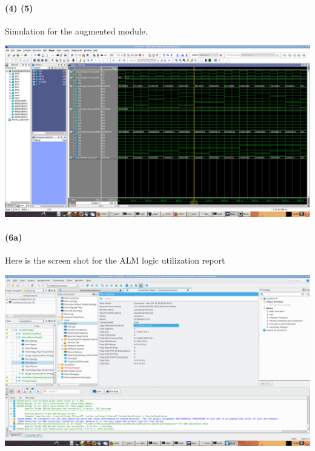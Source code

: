\documentclass{article}
\begin{document}

\paragraph{(4) (5)} Simulation for the augmented module.
\begin{center}
    \includegraphics[scale=0.25]{q1_model_sim.png}
\end{center}{}
\paragraph{(6a)} Here is the screen shot for the ALM logic utilization report
\begin{center}
    \includegraphics[scale=0.25]{q1_6a.png}
\end{center}
\end{document}
